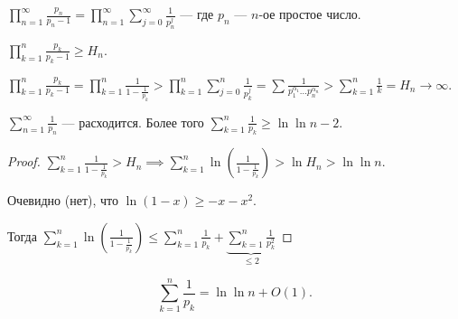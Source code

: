 \begin{example}
    $\prod\limits_{n=1}^\infty \frac{p_n}{p_n - 1} = \prod\limits_{n=1}^\infty \sum\limits_{j=0}^\infty \frac{1}{p_n^j}$ --- где $p_n$ ---  $n$-ое простое число.

     $\prod\limits_{k=1}^n \frac{p_k}{p_k - 1} \ge H_n$.


     $\prod\limits_{k=1}^n \frac{p_k}{p_k - 1} = \prod\limits_{k=1}^n \frac{1}{1-\frac{1}{p_k}} > \prod\limits_{k=1}^n \sum\limits_{j=0}^n \frac{1}{p_k^j} = \sum \frac{1}{p_1^{\alpha_1} \ldots p_n^{\alpha_n}} > \sum\limits_{k=1}^n \frac{1}{k} = H_n \to \infty$.
\end{example}
\begin{theorem}
    $\sum\limits_{n=1}^\infty \frac{1}{p_n}$ --- расходится. Более того $\sum\limits_{k=1}^n \frac{1}{p_k} \ge \ln \ln n - 2$.
\end{theorem}
\begin{proof}
    $\sum\limits_{k=1}^n \frac{1}{1-\frac{1}{p_k}} > H_n \implies \sum\limits_{k=1}^n \ln(\frac{1}{1-\frac{1}{p_k}}) > \ln H_n > \ln \ln n$.

    Очевидно (нет), что $\ln(1-x) \ge -x -x^2$.

    Тогда $\sum\limits_{k=1}^n \ln(\frac{1}{1-\frac{1}{p_k}}) \le \sum\limits_{k=1}^n \frac{1}{p_k} + \underbrace{\sum\limits_{k=1}^n \frac{1}{p_k^2}}_{\le 2}$
\end{proof}
\begin{remark}
    \[
    \sum\limits_{k=1}^n \frac{1}{p_k} = \ln \ln n + O(1)
    .\] 
\end{remark}
